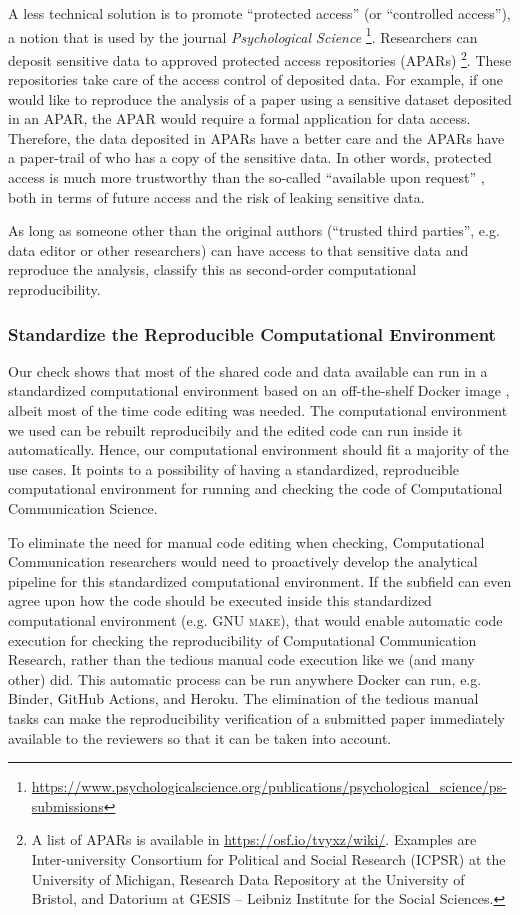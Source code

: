 A less technical solution is to promote ``protected access'' (or ``controlled access''), a notion that is used by the journal \textit{Psychological Science} \footnote{\url{https://www.psychologicalscience.org/publications/psychological_science/ps-submissions}}. Researchers can deposit sensitive data to approved protected access repositories (APARs) \footnote{A list of APARs is available in \url{https://osf.io/tvyxz/wiki/}. Examples are Inter-university Consortium for Political and Social Research (ICPSR) at the University of Michigan, Research Data Repository at the University of Bristol, and Datorium at GESIS – Leibniz Institute for the Social Sciences.}. These repositories take care of the access control of deposited data. For example, if one would like to reproduce the analysis of a paper using a sensitive dataset deposited in an APAR, the APAR would require a formal application for data access. Therefore, the data deposited in APARs have a better care and the APARs have a paper-trail of who has a copy of the sensitive data. In other words, protected access is much more trustworthy than the so-called ``available upon request'' \parencite[]{kr-arferwssm-12}, both in terms of future access and the risk of leaking sensitive data. 

As long as someone other than the original authors (``trusted third parties'', e.g. data editor or other researchers) can have access to that sensitive data and reproduce the analysis, \textcite{schoch:2023:CRC} classify this as second-order computational reproducibility.

\subsubsection{Standardize the Reproducible Computational Environment}
\label{subsubsec:compenviron}
Our check shows that most of the shared code and data available can run in a standardized computational environment based on an off-the-shelf Docker image \parencite[]{boettiger:2017:IR}, albeit most of the time code editing was needed. The computational environment we used can be rebuilt reproducibily and the edited code can run inside it automatically. Hence, our computational environment should fit a majority of the use cases. It points to a possibility of having a standardized, reproducible computational environment for running and checking the code of Computational Communication Science. 

To eliminate the need for manual code editing when checking, Computational Communication researchers would need to proactively develop the analytical pipeline for this standardized computational environment. If the subfield can even agree upon how the code should be executed inside this standardized computational environment (e.g. \textsc{GNU make}), that would enable automatic code execution for checking the reproducibility of Computational Communication Research, rather than the tedious manual code execution like we (and many other) did. This automatic process can be run anywhere Docker can run, e.g. Binder, GitHub Actions, and Heroku. The elimination of the tedious manual tasks can make the reproducibility verification of a submitted paper immediately available to the reviewers so that it can be taken into account.

